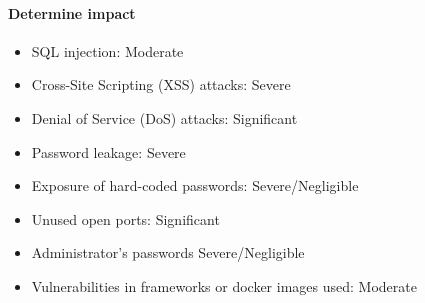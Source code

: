 \documentclass{article}
\begin{document}
	\paragraph{Determine impact}
	\begin{itemize}
		\item SQL injection: Moderate
		\item Cross-Site Scripting (XSS) attacks: Severe
		\item Denial of Service (DoS) attacks: Significant
		\item Password leakage: Severe
		\item Exposure of hard-coded passwords: Severe/Negligible
		\item Unused open ports: Significant
		\item Administrator’s passwords Severe/Negligible
		\item Vulnerabilities in frameworks or docker images used: Moderate
	\end{itemize}
\end{document}
